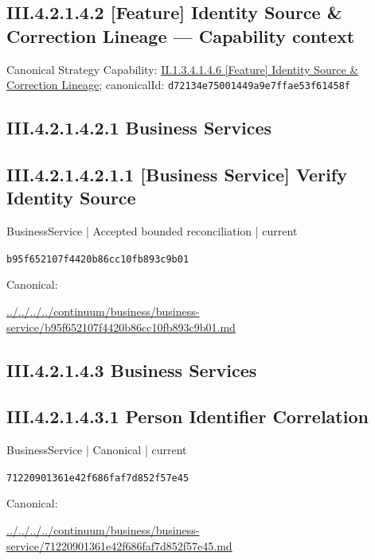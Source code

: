\documentclass[10pt,a4paper]{article}
\begin{document}
\subsection*{III.4.2.1.4.2 [Feature] Identity Source \& Correction Lineage — Capability context}
Canonical Strategy Capability: \hyperref[element-d72134e75001449a9e7ffae53f61458f]{II.1.3.4.1.4.6 [Feature] Identity Source \& Correction Lineage}; canonicalId: \texttt{d72134e75001449a9e7ffae53f61458f}\par
\subsection*{III.4.2.1.4.2.1 Business Services}
\subsection*{III.4.2.1.4.2.1.1 [Business Service] Verify Identity Source}
\label{element-b95f652107f4420b86cc10fb893c9b01}
{\small BusinessService | Accepted bounded reconciliation | current}\par
\texttt{b95f652107f4420b86cc10fb893c9b01}\par
Canonical: \par
{\footnotesize\url{../../../../continuum/business/business-service/b95f652107f4420b86cc10fb893c9b01.md}}\par
\subsection*{III.4.2.1.4.3 Business Services}
\subsection*{III.4.2.1.4.3.1 Person Identifier Correlation}
\label{element-71220901361e42f686faf7d852f57e45}
{\small BusinessService | Canonical | current}\par
\texttt{71220901361e42f686faf7d852f57e45}\par
Canonical: \par
{\footnotesize\url{../../../../continuum/business/business-service/71220901361e42f686faf7d852f57e45.md}}\par
\end{document}
